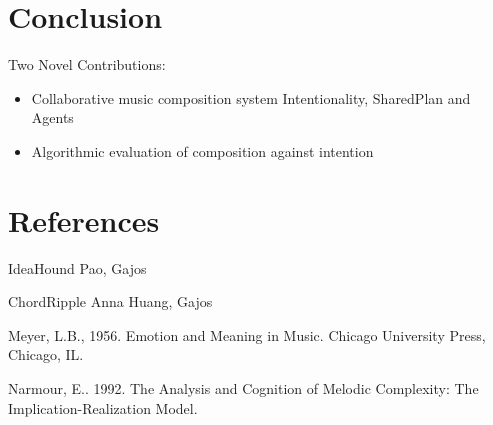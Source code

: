 \documentclass[final,authoryear,5p,times,twocolumn]{elsarticle}
\begin{document}
\begin{itemize}
\end{itemize}

\section{Conclusion}

 
  
 Two Novel Contributions:
 \begin{itemize}
\item Collaborative music composition system 
Intentionality, SharedPlan and Agents
\item Algorithmic evaluation of composition against intention
\end{itemize}


\section{References}

 
IdeaHound Pao, Gajos

ChordRipple Anna Huang, Gajos

Meyer, L.B., 1956. Emotion and Meaning in Music. Chicago University Press, Chicago, IL.

Narmour, E.. 1992. The Analysis and Cognition of Melodic Complexity: The Implication-Realization Model.
\end{document}
